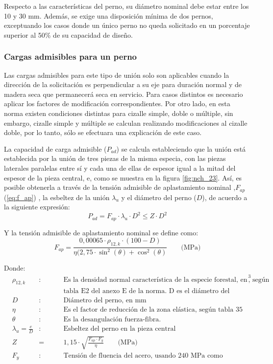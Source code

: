 Respecto a las características del perno, su diámetro nominal debe estar entre los 10 y 30 mm. Además, se exige una disposición mínima de dos pernos, exceptuando los casos donde un único perno no queda solicitado en un porcentaje superior al 50\% de su capacidad de diseño.

\subsubsection{Cargas admisibles para un perno}
Las cargas admisibles para este tipo de unión solo son aplicables cuando la dirección de la solicitación es perpendicular a su eje para duración normal y de madera seca que permanecerá seca en servicio. Para casos distintos es necesario aplicar los factores de modificación correspondientes. Por otro lado, en esta norma existen condiciones distintas para cizalle simple, doble o múltiple, sin embargo, cizalle simple y múltiple se calculan realizando modificaciones al cizalle doble, por lo tanto, sólo se efectuara una explicación de este caso.

La capacidad de carga admisible ($P_{ad}$) se calcula estableciendo que la unión está establecida por la unión de tres piezas de la misma especia, con las piezas laterales paralelas entre sí y cada una de ellas de espesor igual a la mitad del espesor de la pieza central, e, como se muestra en la figura \ref{fig:nch_23}. Así, es posible obtenerla a través de la tensión admisible de aplastamiento nominal ,$F_{ap}$ (\ref{eq:f_ap}) , la esbeltez de la unión $\lambda_u$ y el diámetro del perno ($D$), de acuerdo a la siguiente expresión:
\begin{equation} \label{eq:padm_ad}
	P_{ad} = F_{ap} \cdot \lambda_u \cdot D^2 \leq Z \cdot D^2
\end{equation}

Y la tensión admisible de aplastamiento nominal se define como:
\begin{equation}\label{eq:f_ap}
	F_{ap} = \frac{0,00065\cdot \rho_{12,k}\cdot (100 - D)}{\eta (2,75\cdot \sin^2(\theta) + \cos^2(\theta)} \qquad \text{(MPa)}
\end{equation}


Donde:
\begin{align*}
&\rho_{12,k} &: \qquad &\text{Es la densidad normal característica de la especie forestal, en kg/m}^3 \text{, según}\\
& & & \text{tabla E2 del anexo E de la norma. D es el diámetro del perno, en mm.}\\
&D &: \qquad &\text{Diámetro del perno, en mm}\\
&\eta &: \qquad &\text{Es el factor de reducción de la zona elástica, según tabla 35 de la norma.}\\
&\theta &: \qquad &\text{Es la desangulación fuerza-fibra.}\\
&\lambda_u = \frac{e}{D} &: \qquad &\text{Esbeltez del perno en la pieza central}\\
&Z &= \qquad &1,15\cdot \sqrt{\frac{F_{ap} \cdot F_y}{\eta}} \qquad \text{(MPa)}\\
&F_y &: \qquad &\text{Tensión de fluencia del acero, usando 240 MPa como referencia} 
\end{align*}

